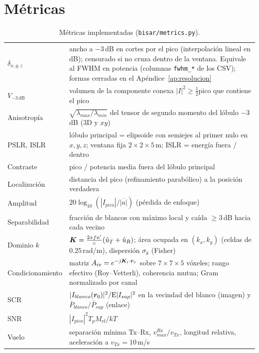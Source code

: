 \section{Métricas}

\begin{table}[H]
\centering\small
\caption{Métricas implementadas (\texttt{bisar/metrics.py}).}
\label{tab:metricas}
\begin{tabular}{@{}L{3.1cm}L{11.2cm}@{}}
\toprule
$\delta_{x,y,z}$ & ancho a $-3$\,dB en cortes por el pico (interpolación lineal en dB);
               censurado si no cruza dentro de la ventana. Equivale al FWHM en potencia
               (columnas \texttt{fwhm\_*} de los CSV); formas cerradas en el Apéndice~\ref{ap:resolucion} \\
$V_{-3\,\mathrm{dB}}$ & volumen de la componente conexa $|I|^2\ge\tfrac12$pico que contiene el pico \\
Anisotropía & $\sqrt{\lambda_{max}/\lambda_{min}}$ del tensor de segundo momento del lóbulo $-3$\,dB (3D y $xy$) \\
PSLR, ISLR & lóbulo principal = elipsoide con semiejes al primer nulo en $x,y,z$; ventana fija
             $2\times2\times5$\,m; ISLR = energía fuera / dentro \\
Contraste & pico / potencia media fuera del lóbulo principal \\
Localización & distancia del pico (refinamiento parabólico) a la posición verdadera \\
Amplitud & $20\log_{10}(|I_{pico}|/\overline{|a|})$ (pérdida de enfoque) \\
Separabilidad & fracción de blancos con máximo local y caída $\ge3$\,dB hacia cada vecino \\
Dominio $k$ & $\bm{K}=\tfrac{2\pi fn'}{c}(\hat u_T+\hat u_R)$; área ocupada en $(k_x,k_y)$ (celdas de $0.25$\,rad/m),
              dispersión $\sigma_{k}$ (Fisher) \\
Condicionamiento & matriz $A_{iv}=e^{-j\bm{K}_i\cdot\bm{r}_v}$ sobre $7\times7\times5$ vóxeles; rango efectivo
                   (Roy--Vetterli), coherencia mutua; Gram normalizado por canal \\
SCR & $|I_{blanco}(\bm{r}_0)|^2/\mathrm{E}|I_{sup}|^2$ en la vecindad del blanco (imagen) y
      $\bar P_{blanco}/\bar P_{sup}$ (enlace) \\
SNR & $|I_{pico}|^2T_pM_{\mathrm{ef}}/kT$ \\
Vuelo & separación mínima Tx--Rx, $v_{max}^{Rx}/v_{Tx}$, longitud relativa, aceleración a $v_{Tx}=10$\,m/s \\
\bottomrule
\end{tabular}
\end{table}

